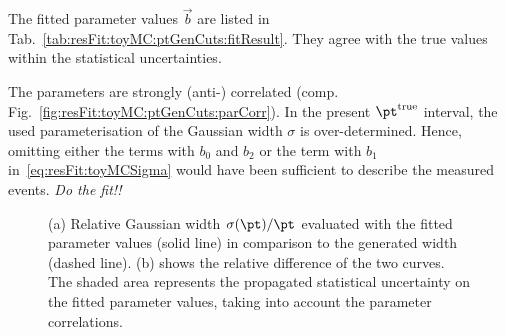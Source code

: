\documentclass[a4paper]{cmspaper} %
\newcommand{\truth}{\ensuremath{\pt^{\text{true}}}\xspace}
\begin{document}
The fitted parameter values $\vec{b}$ are listed in
Tab.~\ref{tab:resFit:toyMC:ptGenCuts:fitResult}.
They agree with the true values within the statistical uncertainties.

The parameters are strongly (anti-) correlated
(comp. Fig.~\ref{fig:resFit:toyMC:ptGenCuts:parCorr}).
In the present \truth interval, the used
parameterisation of the Gaussian width $\sigma$ is
over-determined.
Hence, omitting either the terms with $b_{0}$ and $b_{2}$ or the term
with $b_{1}$ in~\eqref{eq:resFit:toyMCSigma} would have been
sufficient to describe the measured events.
\textit{Do the fit!!}

\begin{figure}[ht]
  \begin{center}
     
  \end{center}
  \caption{(a) Relative Gaussian width $\sigma(\pt)/\pt$ evaluated with the fitted
    parameter values (solid line) in comparison to the generated width
    (dashed line).  (b) shows
    the relative difference of the two curves. The shaded area represents the propagated statistical
    uncertainty on the fitted parameter values, taking into account the
    parameter correlations.}
  \label{fig:resFit:toyMC:ptGenCuts:sigma}
\end{figure}
\end{document}
